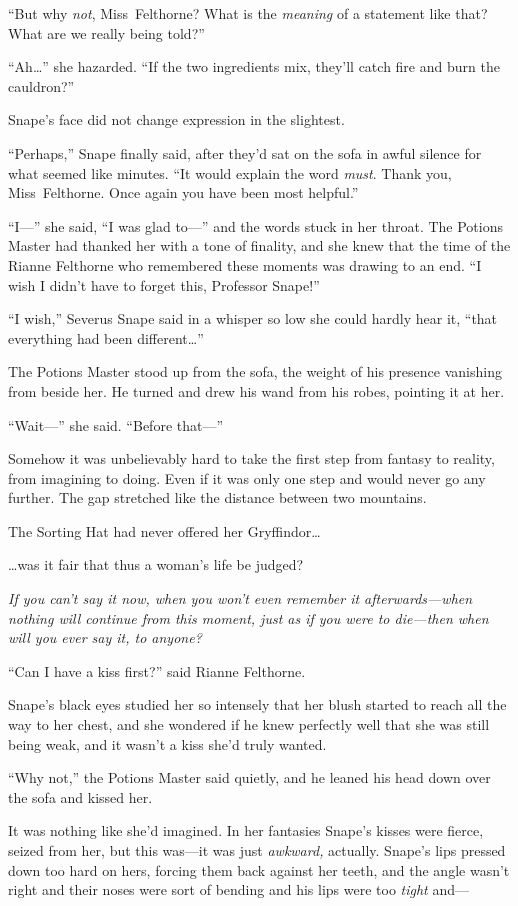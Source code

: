 “But why \emph{not}, Miss~Felthorne? What is the \emph{meaning} of a statement like that? What are we really being told?”

“Ah…” she hazarded. “If the two ingredients mix, they’ll catch fire and burn the cauldron?”

Snape’s face did not change expression in the slightest.

“Perhaps,” Snape finally said, after they’d sat on the sofa in awful silence for what seemed like minutes. “It would explain the word \emph{must}. Thank you, Miss~Felthorne. Once again you have been most helpful.”

“I—” she said, “I was glad to—” and the words stuck in her throat. The Potions Master had thanked her with a tone of finality, and she knew that the time of the Rianne Felthorne who remembered these moments was drawing to an end. “I wish I didn’t have to forget this, Professor Snape!”

“I wish,” Severus Snape said in a whisper so low she could hardly hear it, “that everything had been different…”

The Potions Master stood up from the sofa, the weight of his presence vanishing from beside her. He turned and drew his wand from his robes, pointing it at her.

“Wait—” she said. “Before that—”

Somehow it was unbelievably hard to take the first step from fantasy to reality, from imagining to doing. Even if it was only one step and would never go any further. The gap stretched like the distance between two mountains.

The Sorting Hat had never offered her Gryffindor…

…was it fair that thus a woman’s life be judged?

\emph{If you can’t say it now, when you won’t even remember it afterwards—when nothing will continue from this moment, just as if you were to die—then when will you ever say it, to anyone?}

“Can I have a kiss first?” said Rianne Felthorne.

Snape’s black eyes studied her so intensely that her blush started to reach all the way to her chest, and she wondered if he knew perfectly well that she was still being weak, and it wasn’t a kiss she’d truly wanted.

“Why not,” the Potions Master said quietly, and he leaned his head down over the sofa and kissed her.

It was nothing like she’d imagined. In her fantasies Snape’s kisses were fierce, seized from her, but this was—it was just \emph{awkward,} actually. Snape’s lips pressed down too hard on hers, forcing them back against her teeth, and the angle wasn’t right and their noses were sort of bending and his lips were too \emph{tight} and—

